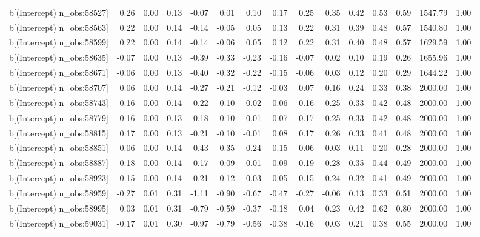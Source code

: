 \begin{table}[ht]
\begin{tabular}{rrrrrrrrrrrrrrr}
  b[(Intercept) n\_obs:58527] & 0.26 & 0.00 & 0.13 & -0.07 & 0.01 & 0.10 & 0.17 & 0.25 & 0.35 & 0.42 & 0.53 & 0.59 & 1547.79 & 1.00 \\ 
  b[(Intercept) n\_obs:58563] & 0.22 & 0.00 & 0.14 & -0.14 & -0.05 & 0.05 & 0.13 & 0.22 & 0.31 & 0.39 & 0.48 & 0.57 & 1540.80 & 1.00 \\ 
  b[(Intercept) n\_obs:58599] & 0.22 & 0.00 & 0.14 & -0.14 & -0.06 & 0.05 & 0.12 & 0.22 & 0.31 & 0.40 & 0.48 & 0.57 & 1629.59 & 1.00 \\ 
  b[(Intercept) n\_obs:58635] & -0.07 & 0.00 & 0.13 & -0.39 & -0.33 & -0.23 & -0.16 & -0.07 & 0.02 & 0.10 & 0.19 & 0.26 & 1655.96 & 1.00 \\ 
  b[(Intercept) n\_obs:58671] & -0.06 & 0.00 & 0.13 & -0.40 & -0.32 & -0.22 & -0.15 & -0.06 & 0.03 & 0.12 & 0.20 & 0.29 & 1644.22 & 1.00 \\ 
  b[(Intercept) n\_obs:58707] & 0.06 & 0.00 & 0.14 & -0.27 & -0.21 & -0.12 & -0.03 & 0.07 & 0.16 & 0.24 & 0.33 & 0.38 & 2000.00 & 1.00 \\ 
  b[(Intercept) n\_obs:58743] & 0.16 & 0.00 & 0.14 & -0.22 & -0.10 & -0.02 & 0.06 & 0.16 & 0.25 & 0.33 & 0.42 & 0.48 & 2000.00 & 1.00 \\ 
  b[(Intercept) n\_obs:58779] & 0.16 & 0.00 & 0.13 & -0.18 & -0.10 & -0.01 & 0.07 & 0.17 & 0.25 & 0.33 & 0.42 & 0.48 & 2000.00 & 1.00 \\ 
  b[(Intercept) n\_obs:58815] & 0.17 & 0.00 & 0.13 & -0.21 & -0.10 & -0.01 & 0.08 & 0.17 & 0.26 & 0.33 & 0.41 & 0.48 & 2000.00 & 1.00 \\ 
  b[(Intercept) n\_obs:58851] & -0.06 & 0.00 & 0.14 & -0.43 & -0.35 & -0.24 & -0.15 & -0.06 & 0.03 & 0.11 & 0.20 & 0.28 & 2000.00 & 1.00 \\ 
  b[(Intercept) n\_obs:58887] & 0.18 & 0.00 & 0.14 & -0.17 & -0.09 & 0.01 & 0.09 & 0.19 & 0.28 & 0.35 & 0.44 & 0.49 & 2000.00 & 1.00 \\ 
  b[(Intercept) n\_obs:58923] & 0.15 & 0.00 & 0.14 & -0.21 & -0.12 & -0.03 & 0.05 & 0.15 & 0.24 & 0.32 & 0.41 & 0.49 & 2000.00 & 1.00 \\ 
  b[(Intercept) n\_obs:58959] & -0.27 & 0.01 & 0.31 & -1.11 & -0.90 & -0.67 & -0.47 & -0.27 & -0.06 & 0.13 & 0.33 & 0.51 & 2000.00 & 1.00 \\ 
  b[(Intercept) n\_obs:58995] & 0.03 & 0.01 & 0.31 & -0.79 & -0.59 & -0.37 & -0.18 & 0.04 & 0.23 & 0.42 & 0.62 & 0.80 & 2000.00 & 1.00 \\ 
  b[(Intercept) n\_obs:59031] & -0.17 & 0.01 & 0.30 & -0.97 & -0.79 & -0.56 & -0.38 & -0.16 & 0.03 & 0.21 & 0.38 & 0.55 & 2000.00 & 1.00 \\ 

\end{tabular}
\end{table}
